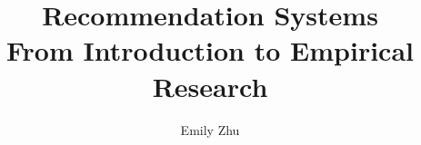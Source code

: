 \documentclass[graybox,envcountchap,sectrefs]{svmono}
\begin{document}
\author{Emily Zhu}
\title{Recommendation Systems\\  From Introduction to Empirical Research}
\subtitle{}
\maketitle

\frontmatter%

%
%
%
%

\tableofcontents




\mainmatter%
%
  
 
 
 
 
 
 
% 

%

\backmatter%

%
\printindex

\end{document}

